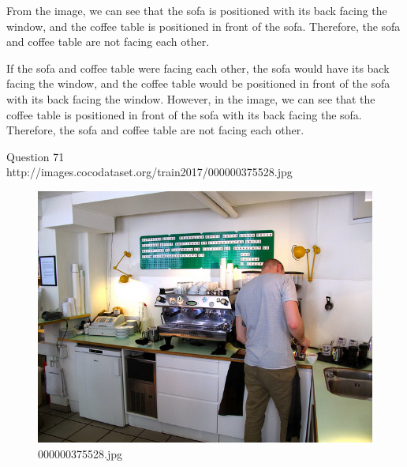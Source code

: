 \begin{enumerate}
    From the image, we can see that the sofa is positioned with its back facing the window, and the coffee table is positioned in front of the sofa. Therefore, the sofa and coffee table are not facing each other.
    
    If the sofa and coffee table were facing each other, the sofa would have its back facing the window, and the coffee table would be positioned in front of the sofa with its back facing the window. However, in the image, we can see that the coffee table is positioned in front of the sofa with its back facing the sofa. Therefore, the sofa and coffee table are not facing each other.
\end{enumerate}
Question 71\\
http://images.cocodataset.org/train2017/000000375528.jpg
\begin{figure}[h]
    \centering
    \includegraphics[width=0.8\linewidth]{../image set/hard/000000375528.jpg}
    \caption{000000375528.jpg}
\end{figure}
